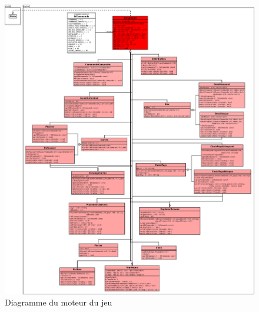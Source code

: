 \begin{landscape}
    \begin{figure}[!htbp]
        \centering
        \includegraphics[width=21cm]{Images/engine.png}
        \caption{Diagramme du moteur du jeu}
        \label{fig:state}
    \end{figure}
\end{landscape}